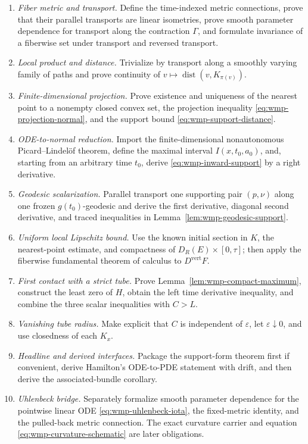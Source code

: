 \documentclass[10pt]{coll-l}
\newcommand{\dist}{\operatorname{dist}}
\theoremstyle{definition}
\theoremstyle{remark}
\numberwithin{section}{chapter}
\numberwithin{equation}{chapter}
\begin{document}
\begin{enumerate}
\item \emph{Fiber metric and transport.}
      Define the time-indexed metric connections, prove that their parallel
      transports are linear isometries, prove smooth parameter dependence
      for transport along the contraction $\Gamma$, and formulate invariance
      of a fiberwise set under transport and reversed transport.
\item \emph{Local product and distance.}
      Trivialize by transport along a smoothly varying family of paths and
      prove continuity of $v\mapsto\dist(v,K_{\pi(v)})$.
\item \emph{Finite-dimensional projection.}
      Prove existence and uniqueness of the nearest point to a nonempty
      closed convex set, the projection inequality
      \eqref{eq:wmp-projection-normal}, and the support bound
      \eqref{eq:wmp-support-distance}.
\item \emph{ODE-to-normal reduction.}
      Import the finite-dimensional nonautonomous Picard--Lindel\"of theorem,
      define the maximal interval $I(x,t_0,a_0)$, and, starting from an
      arbitrary time $t_0$, derive \eqref{eq:wmp-inward-support} by a right
      derivative.
\item \emph{Geodesic scalarization.}
      Parallel transport one supporting pair $(p,\nu)$ along one frozen
      $g(t_0)$-geodesic and derive the first derivative, diagonal second
      derivative, and traced inequalities in
      Lemma~\ref{lem:wmp-geodesic-support}.
\item \emph{Uniform local Lipschitz bound.}
      Use the known initial section in $K$, the nearest-point estimate, and
      compactness of $D_R(E)\times[0,\tau]$; then apply the fiberwise
      fundamental theorem of calculus to $D^{\mathrm{vert}}F$.
\item \emph{First contact with a strict tube.}
      Prove Lemma~\ref{lem:wmp-compact-maximum}, construct the least zero of
      $H$, obtain the left time derivative inequality, and combine the three
      scalar inequalities with $C>L$.
\item \emph{Vanishing tube radius.}
      Make explicit that $C$ is independent of $\varepsilon$, let
      $\varepsilon\downarrow0$, and use closedness of each $K_x$.
\item \emph{Headline and derived interfaces.}
      Package the support-form theorem first if convenient, derive Hamilton's
      ODE-to-PDE statement with drift, and then derive the associated-bundle
      corollary.
\item \emph{Uhlenbeck bridge.}
      Separately formalize smooth parameter dependence for the pointwise
      linear ODE \eqref{eq:wmp-uhlenbeck-iota}, the fixed-metric identity,
      and the pulled-back metric connection.  The exact curvature carrier
      and equation \eqref{eq:wmp-curvature-schematic} are later obligations.
\end{enumerate}
\end{document}
